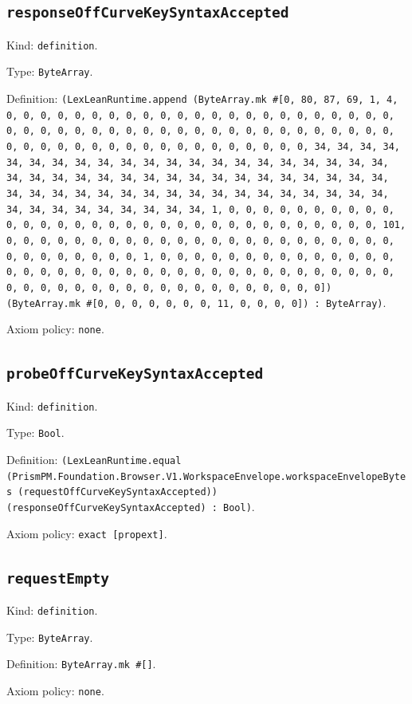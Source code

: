 \documentclass[11pt]{article}
\begin{document}
\subsection*{\texttt{responseOffCurveKeySyntaxAccepted}}
\noindent Kind: \texttt{definition}.\par
\noindent Type: \texttt{ByteArray}.\par
\noindent Definition: \texttt{(LexLeanRuntime.append (ByteArray.mk \#[0, 80, 87, 69, 1, 4, 0, 0, 0, 0, 0, 0, 0, 0, 0, 0, 0, 0, 0, 0, 0, 0, 0, 0, 0, 0, 0, 0, 0, 0, 0, 0, 0, 0, 0, 0, 0, 0, 0, 0, 0, 0, 0, 0, 0, 0, 0, 0, 0, 0, 0, 0, 0, 0, 0, 0, 0, 0, 0, 0, 0, 0, 0, 0, 0, 0, 0, 0, 0, 0, 34, 34, 34, 34, 34, 34, 34, 34, 34, 34, 34, 34, 34, 34, 34, 34, 34, 34, 34, 34, 34, 34, 34, 34, 34, 34, 34, 34, 34, 34, 34, 34, 34, 34, 34, 34, 34, 34, 34, 34, 34, 34, 34, 34, 34, 34, 34, 34, 34, 34, 34, 34, 34, 34, 34, 34, 34, 34, 34, 34, 34, 34, 34, 34, 1, 0, 0, 0, 0, 0, 0, 0, 0, 0, 0, 0, 0, 0, 0, 0, 0, 0, 0, 0, 0, 0, 0, 0, 0, 0, 0, 0, 0, 0, 0, 0, 0, 101, 0, 0, 0, 0, 0, 0, 0, 0, 0, 0, 0, 0, 0, 0, 0, 0, 0, 0, 0, 0, 0, 0, 0, 0, 0, 0, 0, 0, 0, 0, 0, 1, 0, 0, 0, 0, 0, 0, 0, 0, 0, 0, 0, 0, 0, 0, 0, 0, 0, 0, 0, 0, 0, 0, 0, 0, 0, 0, 0, 0, 0, 0, 0, 0, 0, 0, 0, 0, 0, 0, 0, 0, 0, 0, 0, 0, 0, 0, 0, 0, 0, 0, 0, 0, 0, 0, 0, 0]) (ByteArray.mk \#[0, 0, 0, 0, 0, 0, 0, 11, 0, 0, 0, 0]) : ByteArray)}.\par
\noindent Axiom policy: \texttt{none}.\par
\subsection*{\texttt{probeOffCurveKeySyntaxAccepted}}
\noindent Kind: \texttt{definition}.\par
\noindent Type: \texttt{Bool}.\par
\noindent Definition: \texttt{(LexLeanRuntime.equal (PrismPM.Foundation.Browser.V1.WorkspaceEnvelope.workspaceEnvelopeBytes (requestOffCurveKeySyntaxAccepted)) (responseOffCurveKeySyntaxAccepted) : Bool)}.\par
\noindent Axiom policy: \texttt{exact [propext]}.\par
\subsection*{\texttt{requestEmpty}}
\noindent Kind: \texttt{definition}.\par
\noindent Type: \texttt{ByteArray}.\par
\noindent Definition: \texttt{ByteArray.mk \#[]}.\par
\noindent Axiom policy: \texttt{none}.\par
\end{document}
